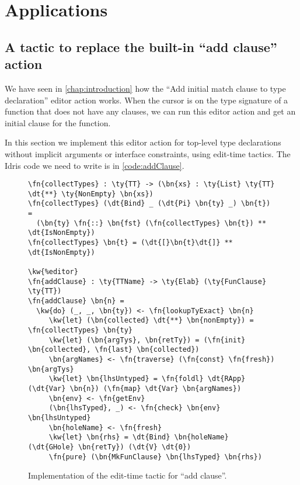 \chapter{Applications} \label{chap:applications}

\section{A tactic to replace the built-in ``add clause'' action}\label{sec:addClause}

We have seen in \autoref{chap:introduction} how the ``Add initial match clause
to type declaration'' editor action works. When the cursor is on the type
signature of a function that does not have any clauses, we can run this editor
action and get an initial clause for the function.

In this section we implement this editor action for top-level type declarations
without implicit arguments or interface constraints, using edit-time tactics.
The Idris code we need to write is in \autoref{code:addClause}.

\begin{figure}[ht]
\caption{Implementation of the edit-time tactic for ``add clause''.}
\label{code:addClause}
\begin{Verbatim}[framesep=2mm, label=\footnotesize{\normalfont{Idris}}, labelposition=topline]
\fn{collectTypes} : \ty{TT} -> (\bn{xs} : \ty{List} \ty{TT} \dt{**} \ty{NonEmpty} \bn{xs})
\fn{collectTypes} (\dt{Bind} _ (\dt{Pi} \bn{ty} _) \bn{t}) =
  (\bn{ty} \fn{::} \bn{fst} (\fn{collectTypes} \bn{t}) ** \dt{IsNonEmpty})
\fn{collectTypes} \bn{t} = (\dt{[}\bn{t}\dt{]} ** \dt{IsNonEmpty})

\kw{%editor}
\fn{addClause} : \ty{TTName} -> \ty{Elab} (\ty{FunClause} \ty{TT})
\fn{addClause} \bn{n} =
  \kw{do} (_, _, \bn{ty}) <- \fn{lookupTyExact} \bn{n}
     \kw{let} (\bn{collected} \dt{**} \bn{nonEmpty}) = \fn{collectTypes} \bn{ty}
     \kw{let} (\bn{argTys}, \bn{retTy}) = (\fn{init} \bn{collected}, \fn{last} \bn{collected})
     \bn{argNames} <- \fn{traverse} (\fn{const} \fn{fresh}) \bn{argTys}
     \kw{let} \bn{lhsUntyped} = \fn{foldl} \dt{RApp} (\dt{Var} \bn{n}) (\fn{map} \dt{Var} \bn{argNames})
     \bn{env} <- \fn{getEnv}
     (\bn{lhsTyped}, _) <- \fn{check} \bn{env} \bn{lhsUntyped}
     \bn{holeName} <- \fn{fresh}
     \kw{let} \bn{rhs} = \dt{Bind} \bn{holeName} (\dt{GHole} \bn{retTy}) (\dt{V} \dt{0})
     \fn{pure} (\bn{MkFunClause} \bn{lhsTyped} \bn{rhs})
\end{Verbatim}
\end{figure}

